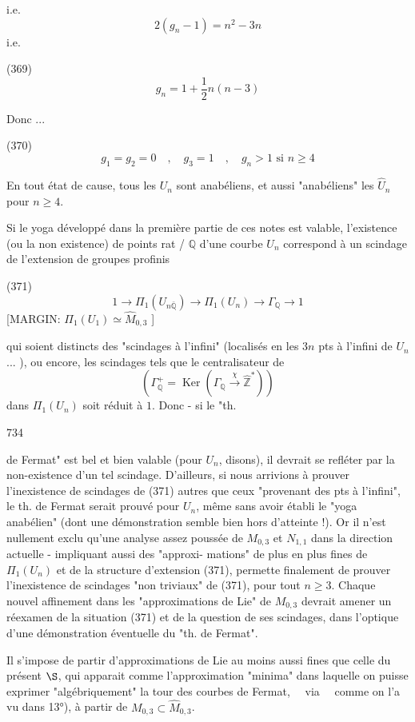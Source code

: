 i.e. $$ 2(g_n-1) = n^2-3n $$ i.e.

(369) $$ g_n = 1 + \frac{1}{2} n(n-3) $$

Donc ... 

(370) $$ g_1 = g_2 = 0 \quad , \quad g_3 = 1 \quad , \quad g_n > 1 \text{ si } n \ge 4 $$

En tout état de cause, tous les $U_n$ sont
anabéliens, et aussi "anabéliens" les $\hat{U}_n$ pour $n \ge 4$.

Si le yoga développé dans la première
partie de ces notes est valable, l'existence
(ou la non existence) de points rat / $\mathbb{Q}$ d'une
courbe $U_n$ correspond à un scindage
de l'extension de groupes profinis

(371) $$ 1 \to \Pi_1(U_{n \bar{\mathbb{Q}}}) \to \Pi_1(U_n) \to \Gamma_{\mathbb{Q}} \to 1 $$
[MARGIN: $\Pi_1(U_1) \simeq \hat{M}_{0,3}$ ]

qui soient distincts des "scindages à l'infini"
(localisés en les $3n$ pts à l'infini de $U_n$ ... ), ou
encore, les scindages tels que le centralisateur de
$$ (\Gamma_{\mathbb{Q}}^+ = \operatorname{Ker}(\Gamma_{\mathbb{Q}} \xrightarrow{\chi} \hat{\mathbb{Z}}^*) ) $$
dans $\Pi_1(U_n)$ soit réduit à $1$. Donc - si le "th.

\newpage


734

de Fermat" est bel et bien valable (pour $U_n$, disons),
il devrait se refléter par la non-existence d'un
tel scindage. D'ailleurs, si nous arrivions à
prouver l'inexistence de scindages de (371) autres
que ceux "provenant des pts à l'infini",
le th. de Fermat serait prouvé pour $U_n$, même
sans avoir établi le "yoga anabélien" (dont une
démonstration semble bien hors d'atteinte !). Or
il n'est nullement exclu qu'une analyse assez
poussée de $M_{0,3}$ et $N_{1,1}$ dans la direction
actuelle - impliquant aussi des "approxi-
mations" de plus en plus fines de
$\Pi_1(U_n)$ et de la structure d'extension (371),
permette finalement de prouver l'inexistence
de scindages "non triviaux" de (371), pour
tout $n \ge 3$. Chaque nouvel affinement dans
les "approximations de Lie" de $M_{0,3}$ devrait
amener un réexamen de la situation (371)
et de la question de ses scindages, dans l'optique
d'une démonstration éventuelle du "th. de Fermat".

\newpage


Il s'impose de partir d'approximations de
Lie au moins aussi fines que celle du
présent $\S$, qui apparait comme l'approximation
"minima" dans laquelle on puisse exprimer
"algébriquement" la tour des courbes de
Fermat, ~~via~~ comme on l'a vu dans 13°),
à partir de $M_{0,3} \subset \hat{M}_{0,3}$.

